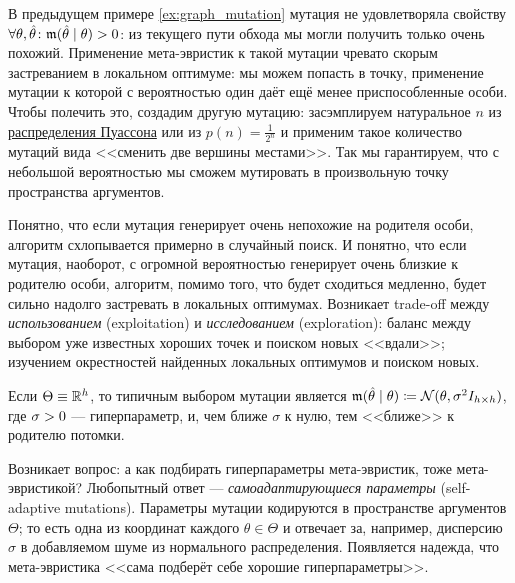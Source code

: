 \begin{example}
В предыдущем примере \ref{ex:graph_mutation} мутация не удовлетворяла свойству $\forall \theta, \hat{\theta} \colon \mut(\hat{\theta} \HM\mid \theta) \HM> 0$: из текущего пути обхода мы могли получить только очень похожий. Применение мета-эвристик к такой мутации чревато скорым застреванием в локальном оптимуме: мы можем попасть в точку, применение мутации к которой с вероятностью один даёт ещё менее приспособленные особи. Чтобы полечить это, создадим другую мутацию: засэмплируем натуральное $n$ из \href{https://ru.wikipedia.org/wiki/Распределение_Пуассона}{распределения Пуассона} или из $p(n) = \frac{1}{2^n}$ и применим такое количество мутаций вида <<сменить две вершины местами>>. Так мы гарантируем, что с небольшой вероятностью мы сможем мутировать в произвольную точку пространства аргументов.
\end{example}

Понятно, что если мутация генерирует очень непохожие на родителя особи, алгоритм схлопывается примерно в случайный поиск. И понятно, что если мутация, наоборот, с огромной вероятностью генерирует очень близкие к родителю особи, алгоритм, помимо того, что будет сходиться медленно, будет сильно надолго застревать в локальных оптимумах. Возникает trade-off между \emph{использованием} (exploitation) и \emph{исследованием} (exploration): баланс между выбором уже известных хороших точек и поиском новых <<вдали>>; изучением окрестностей найденных локальных оптимумов и поиском новых. 

\begin{exampleBox}[label=ex:gaussianmutation]{}
Если $\Theta \HM\equiv \R^h$, то типичным выбором мутации является $\mut(\hat{\theta} \HM\mid \theta) \HM\coloneqq \N(\theta, \sigma^2I_{h \times h})$, где $\sigma \HM> 0$ --- гиперпараметр, и, чем ближе $\sigma$ к нулю, тем <<ближе>> к родителю потомки.
\end{exampleBox}

\begin{remark}
Возникает вопрос: а как подбирать гиперпараметры мета-эвристик, тоже мета-эвристикой? Любопытный ответ --- \emph{самоадаптирующиеся параметры} (self-adaptive mutations). Параметры мутации кодируются в пространстве аргументов $\Theta$; то есть одна из координат каждого $\theta \in \Theta$ и отвечает за, например, дисперсию $\sigma$ в добавляемом шуме из нормального распределения. Появляется надежда, что мета-эвристика <<сама подберёт себе хорошие гиперпараметры>>.
\end{remark}

